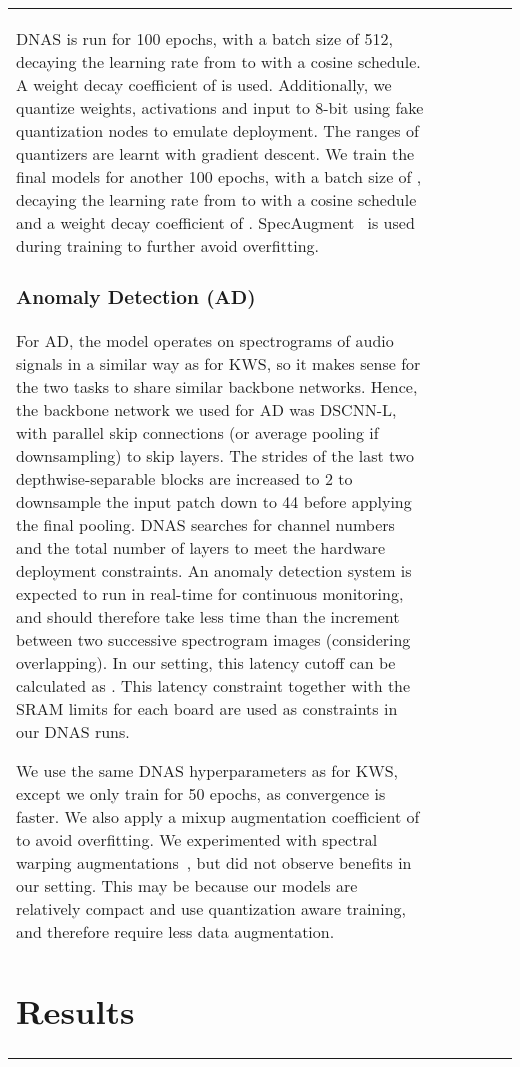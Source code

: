 \documentclass{article}
\begin{document}
\begin{table}[t]
\begin{tabular}{l| c | c | c | c | c}
DNAS is run for 100 epochs, with a batch size of 512, decaying the learning rate from  to  with a cosine schedule. A weight decay coefficient of  is used.  Additionally, we quantize weights, activations and input to 8-bit using fake quantization nodes to emulate deployment. The ranges of quantizers are learnt with gradient descent. 
We train the final models for another 100 epochs, with a batch size of , decaying the learning rate from  to  with a cosine schedule and a weight decay coefficient of . SpecAugment~\cite{park2019specaugment} is used during training to further avoid overfitting.



\subsubsection{Anomaly Detection (AD)}
For AD, the model operates on spectrograms of audio signals in a similar way as for KWS, so it makes sense for the two tasks to share similar backbone networks. 
Hence, the backbone network we used for AD was DSCNN-L, with parallel skip connections (or average pooling if downsampling) to skip layers.
The strides of the last two depthwise-separable blocks are increased to 2 to downsample the input patch down to 44 before applying the final pooling. DNAS searches for channel numbers and the total number of layers to meet the hardware deployment constraints. An anomaly detection system is expected to run in real-time for continuous monitoring, and 
should therefore take less time than the increment between two successive spectrogram images (considering overlapping). 
In our setting, this latency cutoff can be calculated as . This latency constraint together with the SRAM limits for each board are used as constraints in our DNAS runs. 

We use the same DNAS hyperparameters as for KWS, except we only train for 50 epochs, as convergence is faster. We also apply a mixup \cite{zhang2017mixup} augmentation coefficient of  to avoid overfitting. We experimented with spectral warping augmentations~\citet{Giri2020}, but did not observe benefits in our setting. This may be 
because our models are relatively compact and use quantization aware training, and therefore require less data augmentation.



\vspace{-5pt}
\section{Results}



\end{tabular}
\end{table}
\end{document}
